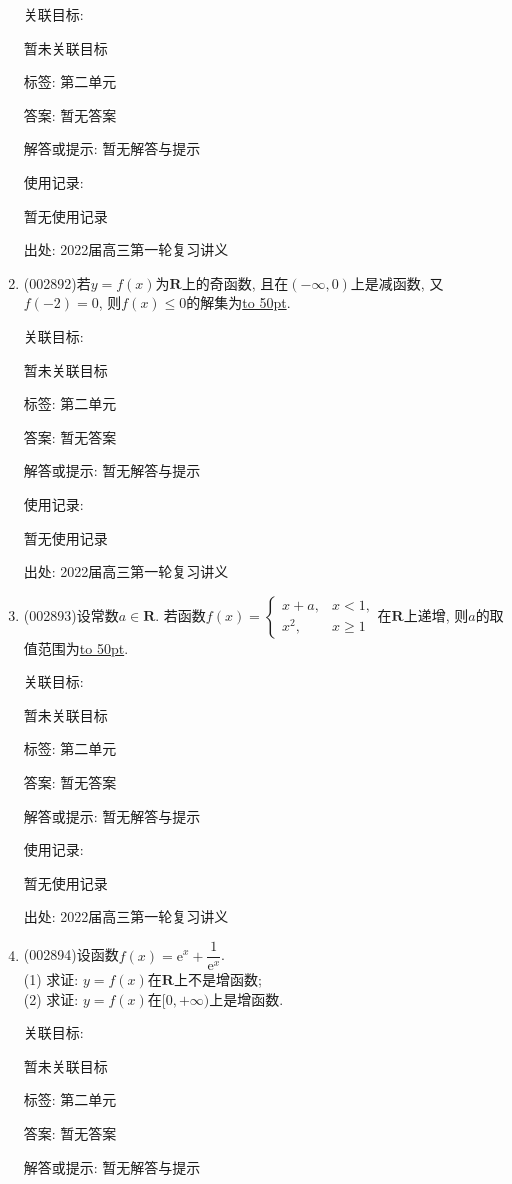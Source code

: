 \documentclass[10pt,a4paper]{article}
\newcommand{\blank}[1]{\underline{\hbox to #1pt{}}}
\begin{document}
\begin{enumerate}[1.]
关联目标:

暂未关联目标



标签: 第二单元

答案: 暂无答案

解答或提示: 暂无解答与提示

使用记录:

暂无使用记录


出处: 2022届高三第一轮复习讲义
\item { (002892)}若$y=f(x)$为$\mathbf{R}$上的奇函数, 且在$(-\infty,0)$上是减函数, 又$f(-2)=0$, 则$f(x)\le 0$的解集为\blank{50}.


关联目标:

暂未关联目标



标签: 第二单元

答案: 暂无答案

解答或提示: 暂无解答与提示

使用记录:

暂无使用记录


出处: 2022届高三第一轮复习讲义
\item { (002893)}设常数$a\in \mathbf{R}$. 若函数$f(x)=\begin{cases} x+a,& x<1, \\ x^2,& x\ge 1 \end{cases}$在$\mathbf{R}$上递增, 则$a$的取值范围为\blank{50}.


关联目标:

暂未关联目标



标签: 第二单元

答案: 暂无答案

解答或提示: 暂无解答与提示

使用记录:

暂无使用记录


出处: 2022届高三第一轮复习讲义
\item { (002894)}设函数$f(x)=\mathrm{e}^x+\dfrac 1{\mathrm{e}^x}$.\\
(1) 求证: $y=f(x)$在$\mathbf{R}$上不是增函数;\\
(2) 求证: $y=f(x)$在$[0,+\infty)$上是增函数.


关联目标:

暂未关联目标



标签: 第二单元

答案: 暂无答案

解答或提示: 暂无解答与提示


\end{enumerate}
\end{document}
